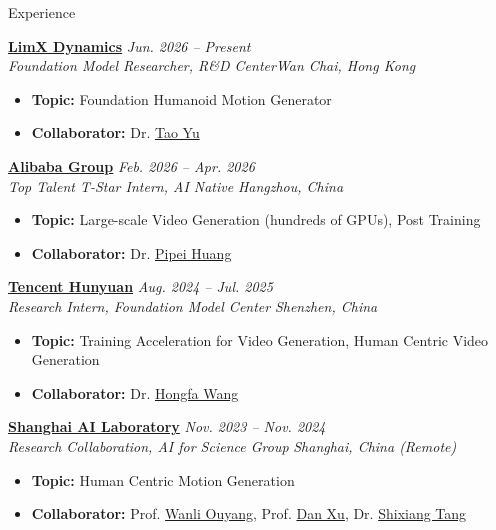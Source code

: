 \documentclass[a4paper]{resume} %
\begin{document}



\begin{rSection}{Experience}

{\bf \href{https://www.limxdynamics.com/en}{LimX Dynamics}} \hfill{\it Jun. 2026 -- Present}\\
{\it Foundation Model Researcher, R\&D Center}\hfill{\it Wan Chai, Hong Kong}
\begin{itemize}
    \item {\bf Topic:} Foundation Humanoid Motion Generator
 	\item {\bf Collaborator:} Dr. \href{https://geekyutao.github.io}{Tao Yu}
\end{itemize}


{\bf \href{https://www.alibaba.com}{Alibaba Group}} \hfill{\it Feb. 2026 -- Apr. 2026}\\
{\it Top Talent T-Star Intern, AI Native} \hfill{\it Hangzhou, China}
\begin{itemize}
    \item {\bf Topic:} Large-scale Video Generation (hundreds of GPUs), Post Training
 	\item {\bf Collaborator:} Dr. \href{https://scholar.google.com/citations?user=RPqpC-cAAAAJ}{Pipei Huang}
\end{itemize}


{\bf \href{https://www.tencent.com/en-us/}{Tencent Hunyuan}} \hfill{\it Aug. 2024 -- Jul. 2025}\\
{\it Research Intern, Foundation Model Center} \hfill{\it Shenzhen, China}
\begin{itemize}
    \item {\bf Topic:} Training Acceleration for Video Generation, Human Centric Video Generation
 	\item {\bf Collaborator:} Dr. \href{https://scholar.google.com/citations?user=q9Fn50QAAAAJ\&hl=en\&oi=ao}{Hongfa Wang}
\end{itemize}


{\bf \href{https://www.shlab.org.cn}{Shanghai AI Laboratory}} \hfill{\it Nov. 2023 -- Nov. 2024}\\
{\it Research Collaboration, AI for Science Group} \hfill{\it Shanghai, China (Remote)}
\begin{itemize}
    \item {\bf Topic:} Human Centric Motion Generation
 	\item {\bf Collaborator:} Prof. \href{https://wlouyang.github.io/}{Wanli Ouyang}, Prof. \href{https://www.danxurgb.net/}{Dan Xu}, Dr. \href{https://scholar.google.com.tw/citations?user=TJ4ihdkAAAAJ}{Shixiang Tang}
\end{itemize}



\end{rSection}
\end{document}
